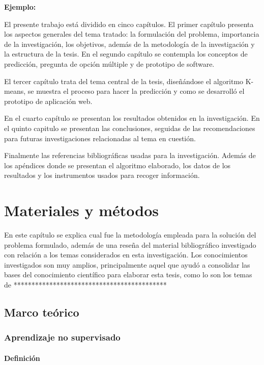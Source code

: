 {\bf Ejemplo:}\par
\vskip 0.1cm
El presente trabajo está dividido en cinco capítulos. El primer capítulo presenta los aspectos generales del tema tratado: la formulación del problema, importancia de la investigación, los objetivos, además de la metodología de la investigación y la estructura de la tesis. En el segundo capítulo se contempla los conceptos de predicción, pregunta de opción múltiple y de prototipo de software.

El tercer capítulo trata del tema central de la tesis, diseñándose el algoritmo K-means, se muestra el proceso para hacer la predicción y como se desarrolló el prototipo de aplicación web.

En el cuarto capítulo se presentan los resultados obtenidos en la investigación. En el quinto capitulo se presentan las conclusiones, seguidas de las recomendaciones para futuras investigaciones relacionadas al tema en cuestión. 

Finalmente las referencias bibliográficas usadas para la investigación. Además de los apéndices donde se presentan el algoritmo elaborado, los datos de los resultados y los instrumentos usados para recoger información.

\chapter{Materiales y métodos}

En este capítulo se explica cual fue la metodología empleada para la solución del problema formulado, además de una reseña del material bibliográfico investigado con relación a los temas considerados en esta investigación. Los conocimientos investigados son muy amplios, principalmente aquel que ayudó a consolidar las bases del conocimiento científico para elaborar esta tesis, como lo son los temas de *******************************************


\section{Marco teórico}
\subsection{Aprendizaje no supervisado}

\subsubsection{Definición}

